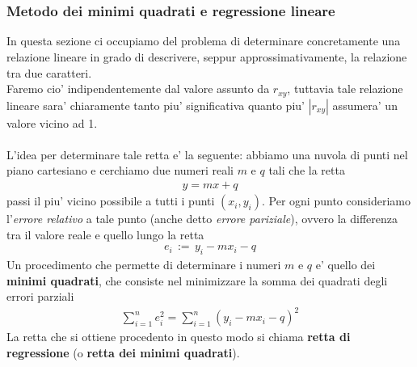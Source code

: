 \documentclass[a4paper,12pt]{article}
\begin{document}
\\
\vspace{1px}\\
\subsubsection{Metodo dei minimi quadrati e regressione lineare}
In questa sezione ci occupiamo del problema di determinare concretamente una relazione lineare in grado di descrivere, seppur approssimativamente, la relazione tra due caratteri.\\
Faremo cio' indipendentemente dal valore assunto da $r_{xy}$, tuttavia tale relazione lineare sara' chiaramente tanto piu' significativa quanto piu' $|r_{xy}|$ assumera' un valore vicino ad 1.\\
\vspace{1px}\\
L’idea per determinare tale retta e' la seguente: abbiamo una nuvola di punti nel piano cartesiano e cerchiamo due numeri reali $m$ e $q$ tali che la retta
\begin{align*}
  y = mx + q
\end{align*}
passi il piu' vicino possibile a tutti i punti $(x_i, y_i)$. Per ogni punto consideriamo l'\textit{errore relativo} a tale punto (anche detto \textit{errore pariziale}), ovvero la differenza tra il valore reale e quello lungo la retta
\begin{align*}
  e_i \, := \, y_i - m x_i - q
\end{align*}
Un procedimento che permette di determinare i numeri $m$ e $q$ e' quello dei \textbf{minimi quadrati}, che consiste nel minimizzare la somma dei quadrati degli errori parziali
\begin{align*}
  \sum_{i=1}^{n} e_i^2 = \sum_{i=1}^{n} (y_i - m x_i - q)^2
\end{align*}
La retta che si ottiene procedento in questo modo si chiama \textbf{retta di regressione} (o \textbf{retta dei minimi quadrati}).\\
\end{document}
